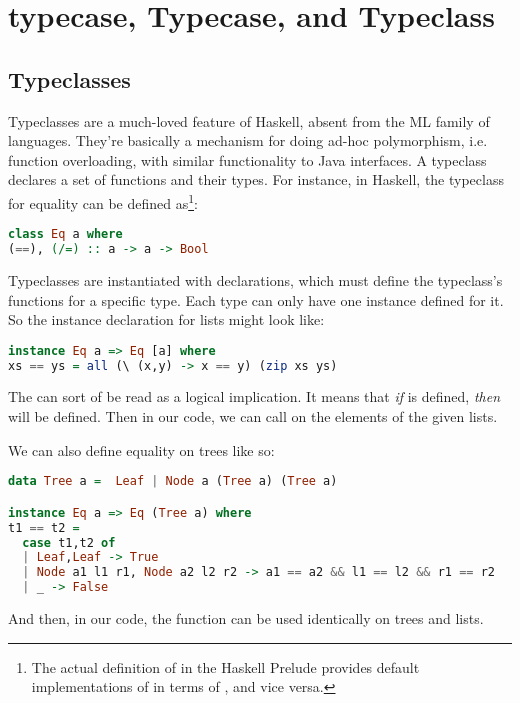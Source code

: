 \message{ !name(report.tex)}\documentclass[pageno]{jpaper}
\begin{document}
{{{\section{typecase, Typecase, and Typeclass}

\subsection{Typeclasses}
Typeclasses are a much-loved feature of Haskell, absent from the ML family of languages. They're basically
a mechanism for doing ad-hoc polymorphism, i.e. function overloading, with similar functionality to
Java interfaces. A typeclass declares a set of functions and their types.
For instance, in Haskell, the  typeclass for equality can be defined as\footnote{The actual
definition of  in the Haskell Prelude provides default implementations of \lstiH{/=} in terms of \lstiH{==}, and vice versa.}:

\begin{lstlisting}[language=Haskell]
class Eq a where
(==), (/=) :: a -> a -> Bool
\end{lstlisting}

Typeclasses are instantiated with  declarations, which must define the typeclass's functions for a specific type.  Each type can only have one instance defined for it. So the
instance declaration for lists might look like:

\begin{lstlisting}[language=Haskell]
instance Eq a => Eq [a] where
xs == ys = all (\ (x,y) -> x == y) (zip xs ys)
\end{lstlisting}

The \lstiH{=>} can sort of be read as a logical implication. It means that \textit{if}  is defined, \textit{then}  will be defined.
Then in our code, we can call \lstiH{==} on the elements of the given lists.

We can also define equality on trees like so:

\begin{lstlisting}[language=Haskell]
data Tree a =  Leaf | Node a (Tree a) (Tree a)

instance Eq a => Eq (Tree a) where
t1 == t2 =
  case t1,t2 of
  | Leaf,Leaf -> True
  | Node a1 l1 r1, Node a2 l2 r2 -> a1 == a2 && l1 == l2 && r1 == r2
  | _ -> False
\end{lstlisting}

And then, in our code, the \lstiH{==} function can be used identically on trees and lists.

}}}
\end{document}
